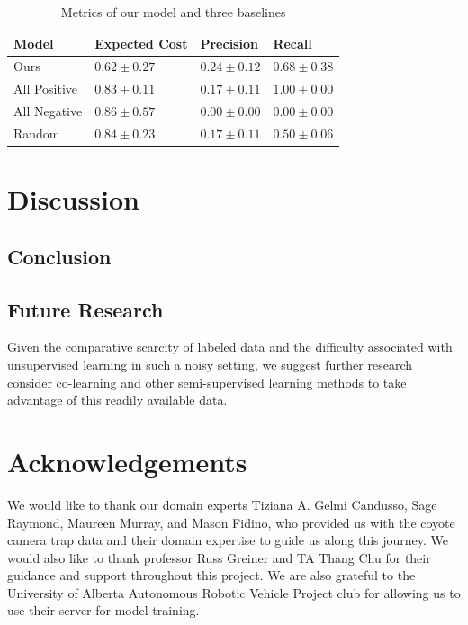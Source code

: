\documentclass{article}
\begin{document}
\begin{table}
  \caption{Metrics of our model and three baselines}
  \label{results}
  \centering
  \begin{tabular}{llll}
    \topfigrule
    Model     & Expected Cost     & Precision & Recall \\
    \midrule
    Ours & $\mathbf{0.62} \pm 0.27$ & $\mathbf{0.24} \pm 0.12$ & $0.68 \pm 0.38$     \\
    All Positive & $0.83 \pm 0.11$    & $0.17 \pm 0.11$ & $\mathbf{1.00} \pm 0.00$     \\
    All Negative & $0.86 \pm 0.57$    & $0.00 \pm 0.00$ & $0.00 \pm 0.00$     \\
    Random & $0.84 \pm 0.23$    & $0.17 \pm 0.11$ & $0.50 \pm 0.06$     \\
    \bottomrule
  \end{tabular}
\end{table}

\section{Discussion} \label{sec:discussion}

\subsection{Conclusion}\label{sec:conclusion}

\subsection{Future Research}
Given the comparative scarcity of labeled data and the difficulty associated
with unsupervised learning in such a noisy setting, we suggest further research
consider co-learning and other semi-supervised learning methods to take
advantage of this readily available data.

\section{Acknowledgements} \label{sec:acknowledgements}
We would like to thank our domain experts Tiziana A. Gelmi Candusso, Sage
Raymond, Maureen Murray, and Mason Fidino, who provided us with the coyote
camera trap data and their domain expertise to guide us along this journey. We
would also like to thank professor Russ Greiner and TA Thang Chu for their
guidance and support throughout this project. We are also grateful to the
University of Alberta Autonomous Robotic Vehicle Project club for allowing us
to use their server for model training.

\clearpage

\small



\end{document}
